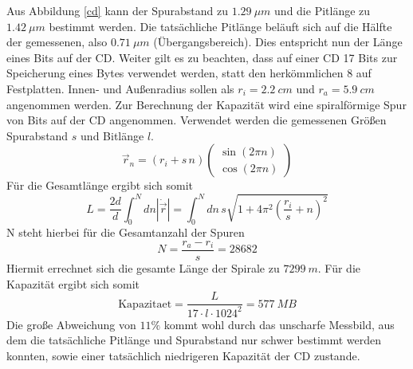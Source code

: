 Aus Abbildung \ref{cd} kann der Spurabstand zu $\SI{1,29}{\mu m}$ und die
Pitlänge zu $\SI{1,42}{\mu m}$ bestimmt werden. 
Die tatsächliche Pitlänge beläuft sich auf die Hälfte der gemessenen, also
$\SI{0,71}{\mu m}$ (Übergangsbereich). Dies entspricht nun der Länge eines
Bits auf der CD. Weiter gilt es zu beachten, dass auf einer CD 17 Bits zur
Speicherung eines Bytes verwendet werden, statt den herkömmlichen 8 auf 
Festplatten. Innen- und Außenradius sollen als $r_i = \SI{2,2}{cm}$ und 
$r_a = \SI{5,9}{cm}$ angenommen werden. 
\vspace{6pt}
Zur Berechnung der Kapazität wird eine spiralförmige Spur von Bits auf der CD
angenommen. Verwendet werden die gemessenen Größen Spurabstand $s$ und 
Bitlänge $l$.
\[
    \vec{r}_n = (r_i+s \, n) 
        \begin{pmatrix}
            \sin(2\pi n)\\
            \cos(2\pi n)
        \end{pmatrix}
\]
Für die Gesamtlänge ergibt sich somit
\[
    L = \frac{2d}{d} \int_0^N dn | \dot{\vec{r}} | = \int_0^N dn \, s
        \sqrt{1 + 4 \pi^2 \left( \frac{r_i}{s} + n \right)^2} 
\]
N steht hierbei für die Gesamtanzahl der Spuren
\[
    N = \frac{r_a - r_i}{s} = 28682
\]
Hiermit errechnet sich die gesamte Länge der Spirale zu $\SI{7299}{m}$.
Für die Kapazität ergibt sich somit
\[
    \text{Kapazitaet} = \frac{L}{17 \cdot l \cdot 1024^2} = \SI{577}{MB}
\]
Die große Abweichung von $11 \%$ kommt wohl durch das unscharfe Messbild, aus
dem die tatsächliche Pitlänge und Spurabstand nur schwer bestimmt werden konnten,
sowie einer tatsächlich niedrigeren Kapazität der CD zustande.
